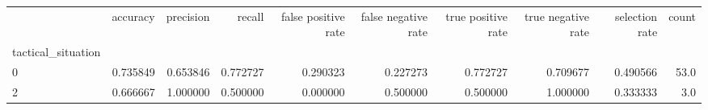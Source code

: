 \begin{tabular}{lrrrrrrrrr}
\toprule
{} &  accuracy &  precision &    recall &  false positive rate &  false negative rate &  true positive rate &  true negative rate &  selection rate &  count \\
tactical\_situation &           &            &           &                      &                      &                     &                     &                 &        \\
\midrule
0                  &  0.735849 &   0.653846 &  0.772727 &             0.290323 &             0.227273 &            0.772727 &            0.709677 &        0.490566 &   53.0 \\
2                  &  0.666667 &   1.000000 &  0.500000 &             0.000000 &             0.500000 &            0.500000 &            1.000000 &        0.333333 &    3.0 \\
\bottomrule
\end{tabular}
